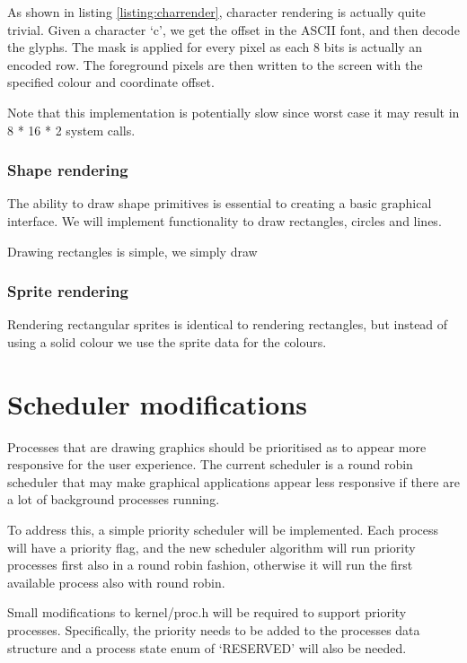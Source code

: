 As shown in listing \ref{listing:charrender}, character rendering is actually 
quite trivial. Given a character `c', we get the offset in the ASCII font, and
then decode the glyphs. The mask is applied for every pixel as each 8 bits
is actually an encoded row. The foreground pixels are then written to the screen
with the specified colour and coordinate offset.

Note that this implementation is potentially slow since worst case it may result in 
8 * 16 * 2 system calls.

\subsubsection{Shape rendering}
The ability to draw shape primitives is essential to creating a basic graphical interface.
We will implement functionality to draw rectangles, circles and lines.

Drawing rectangles is simple, we simply draw 

\subsubsection{Sprite rendering}
Rendering rectangular sprites is identical to rendering rectangles, but instead
of using a solid colour we use the sprite data for the colours.

\section{Scheduler modifications}
Processes that are drawing graphics should be prioritised as to appear more
responsive for the user experience. The current scheduler is a round robin 
scheduler that may make graphical applications appear less responsive if there are a
lot of background processes running.

To address this, a simple priority scheduler will be implemented. Each process will
have a priority flag, and the new scheduler algorithm will run priority processes
first also in a round robin fashion, otherwise it will run the first available
process also with round robin.

Small modifications to kernel/proc.h will be required to support priority processes.
Specifically, the priority needs to be added to the processes data structure and a
process state enum of `RESERVED' will also be needed.

